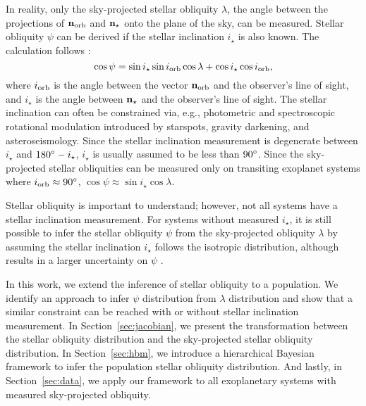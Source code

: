 \documentclass[twocolumn,times]{aastex631}
\begin{document}
In reality, only the sky-projected stellar obliquity $\lambda$, the angle between the projections of $\bf{n}_{\rm orb}$ and $\bf{n}_{\star}$ onto the plane of the sky, can be measured. Stellar obliquity $\psi$ can be derived if the stellar inclination $i_\star$ is also known. The calculation follows \citep[e.g.,][]{Fabrycky09}:
\begin{equation}\label{eqn:psi}
    \cos{\psi} = \sin{i_\star}\sin{i_{\rm orb}}\cos{\lambda} + \cos{i_\star}\cos{i_{\rm orb}},
\end{equation}
where $i_{\rm orb}$ is the angle between the vector $\bf{n}_{\rm orb}$ and the observer's line of sight, and $i_\star$ is the angle between $\bf{n}_{\star}$ and the observer's line of sight.
The stellar inclination can often be constrained via, e.g., photometric and spectroscopic rotational modulation introduced by starspots, gravity darkening, and asteroseismology. Since the stellar inclination measurement is degenerate between $i_\star$ and $180\mbox{$^\circ$} - i_\star$, $i_\star$ is usually assumed to be less than $90\mbox{$^\circ$}$.
Since the sky-projected stellar obliquities can be measured only on transiting exoplanet systems where $i_{\rm orb} \approx 90\mbox{$^\circ$}$, $\cos{\psi} \approx \sin{i_\star}\cos{\lambda}$.

Stellar obliquity is important to understand; however, not all systems have a stellar inclination measurement.
For systems without measured $i_\star$, it is still possible to infer the stellar obliquity $\psi$ from the sky-projected obliquity $\lambda$ by assuming the stellar inclination $i_\star$ follows the isotropic distribution, although results in a larger uncertainty on $\psi$ \citep{Fabrycky09}.

In this work, we extend the inference of stellar obliquity to a population. We identify an approach to infer $\psi$ distribution from $\lambda$ distribution and show that a similar constraint can be reached with or without stellar inclination measurement.
In Section~\ref{sec:jacobian}, we present the transformation between the stellar obliquity distribution and the sky-projected stellar obliquity distribution.
In Section~\ref{sec:hbm}, we introduce a hierarchical Bayesian framework to infer the population stellar obliquity distribution. 
And lastly, in Section~\ref{sec:data}, we apply our framework to all exoplanetary systems with measured sky-projected obliquity.
\end{document}
